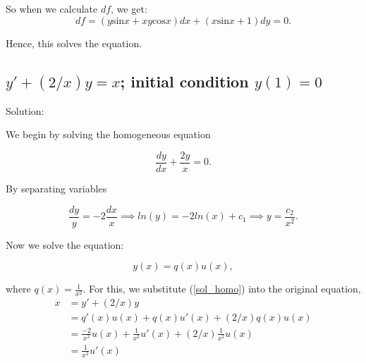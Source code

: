 \documentclass{article}
\begin{document}
		
		So when we calculate $df$, we get:
		\[ df = (y\text{sin}x + xy\text{cos}x)dx + (x\text{sin}x + 1)dy =0.\]
		
		Hence, this solves the equation.
		
\subsection{$y' + (2/x)y = x$; initial condition $y(1)=0$}

		Solution:

		We begin by solving the homogeneous equation

		\[ \frac{dy}{dx} + \frac{2y}{x} = 0.\]

		By separating variables  %

		\[\frac{dy}{y} = -2\frac{dx}{x} \implies ln(y) = -2ln(x) + c_1 \implies y = \frac{c_2}{x^2}.\]

		Now we solve the equation:

		\begin{equation} \label{sol_homo}
			y(x) = q(x)u(x),
		\end{equation}

		where $q(x) = \frac{1}{x^2}$. For this, we substitute (\ref{sol_homo}) into the original equation,
       \begin{equation*}
	         \begin{aligned}
	        	x&=y' + (2/x)y \\
	        	&=q'(x)u(x) +q(x)u'(x) + (2/x)q(x)u(x) \\
	        	&=\frac{-2}{x^3}	u(x) +\frac{1}{x^2}u'(x) + (2/x)\frac{1}{x^2}u(x)\\
	        	&=\frac{1}{x^2}u'(x)
	         \end{aligned}
       \end{equation*}
   
\end{document}
